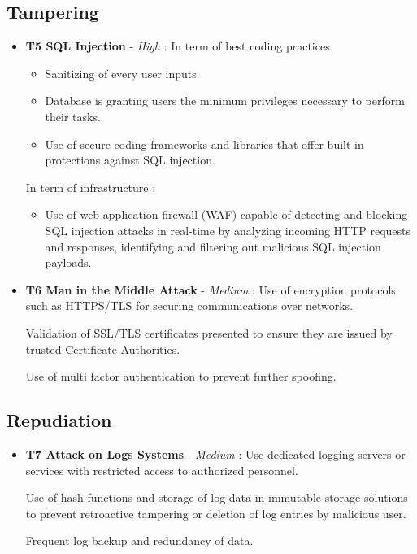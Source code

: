 \documentclass[12pt]{article}
\begin{document}
\subsection{Tampering}
\begin{itemize}
    \item \textbf{T5 SQL Injection} - \textit{High} : In term of best coding practices 
        \begin{itemize}
            \item Sanitizing of every user inputs.
            \item Database is granting users the minimum privileges necessary to perform their tasks.
            \item Use of secure coding frameworks and libraries that offer built-in protections against SQL injection.
        \end{itemize}
    In term of infrastructure : 
        \begin{itemize}
            \item Use of web application firewall (WAF) capable of detecting and blocking SQL injection attacks in real-time by analyzing incoming HTTP requests and responses, identifying and filtering out malicious SQL injection payloads.
        \end{itemize}
        
    \item \textbf{T6 Man in the Middle Attack} - \textit{Medium} : Use of encryption protocols such as HTTPS/TLS for securing communications over networks.

    Validation of SSL/TLS certificates presented to ensure they are issued by trusted Certificate Authorities.

    Use of multi factor authentication to prevent further spoofing.
\end{itemize}

\subsection{Repudiation}
\begin{itemize}
    \item \textbf{T7 Attack on Logs Systems} - \textit{Medium} : Use dedicated logging servers or services with restricted access to authorized personnel.

    Use of hash functions and storage of log data in immutable storage solutions to prevent retroactive tampering or deletion of log entries by malicious user.

    Frequent log backup and redundancy of data.
    
\end{itemize}
\end{document}
